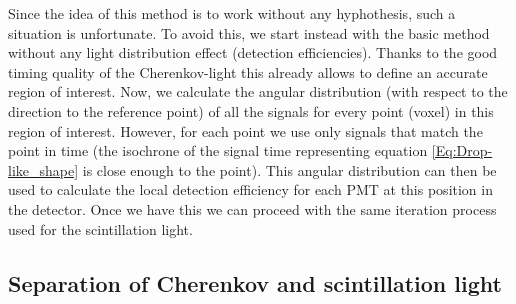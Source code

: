   Since the idea of this method is to work without any hyphothesis, such a situation is unfortunate. To avoid
  this, we start instead with the basic method without any light distribution effect (detection efficiencies). Thanks to 
  the good timing quality of the Cherenkov-light this already allows to define an accurate region of interest. Now, we 
  calculate the angular distribution (with respect to the direction to the reference point) of all the signals for every
  point (voxel) in this region of interest. However, for each point we use only signals that match the point in time 
  (the isochrone  of the signal time representing equation \ref{Eq:Drop-like_shape} is close enough to the point). This 
  angular distribution can then be used to calculate the local detection efficiency for each PMT at this position in the 
  detector. Once we have this we can proceed with the same iteration process used for the scintillation light.
  
  
  
  \subsection*{Separation of Cherenkov and scintillation light}
  

 
  





